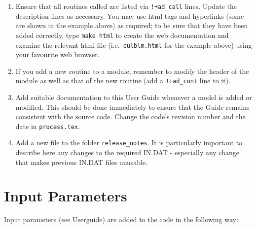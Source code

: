 \documentclass[11pt,a4paper]{report}
\begin{document}
\begin{enumerate}
\item Ensure that all routines called are listed via
  \verb.!+ad_call. lines.  Update the description lines as necessary. You may
  use html tags and hyperlinks (some are shown in the example above) as
  required; to be sure that they have been added correctly, type \texttt{make
    html} to create the web documentation and examine the relevant html file
  (i.e.\ \texttt{culblm.html} for the example above) using your favourite web
  browser.

\item If you add a new routine to a module, remember to modify the header of the module as well as that of the new routine (add a \verb.!+ad_cont. line to it).

\item Add suitable documentation to this User Guide whenever a
  model is added or modified. This should be done immediately to ensure that
  the Guide remains consistent with the source code. Change the code's revision
  number and the date in \texttt{process.tex}.

\item Add a new file to the folder \texttt{release\_notes}.  It is particularly important to describe here any changes to the required IN.DAT - especially any change that makes previous IN.DAT files unusable.

\end{enumerate}

\section{Input Parameters}

Input parameters (see Userguide) are added to the code in the
following way:
\end{document}
